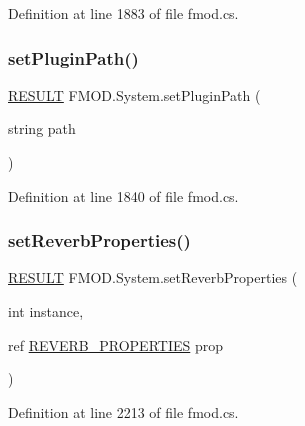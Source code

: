 Definition at line 1883 of file fmod.\+cs.

\mbox{\label{class_f_m_o_d_1_1_system_a7ca34f3a64d08e03eb9683f006e68df2}} 
\subsubsection{\texorpdfstring{set\+Plugin\+Path()}{setPluginPath()}}
{\footnotesize\ttfamily \hyperlink{namespace_f_m_o_d_a305d1176ef3f8c8815861a60407ac33d}{R\+E\+S\+U\+LT} F\+M\+O\+D.\+System.\+set\+Plugin\+Path (\begin{DoxyParamCaption}\item[{string}]{path }\end{DoxyParamCaption})}



Definition at line 1840 of file fmod.\+cs.

\mbox{\label{class_f_m_o_d_1_1_system_a9eb6692c2ca8bb093b1d8ce58959927a}} 
\subsubsection{\texorpdfstring{set\+Reverb\+Properties()}{setReverbProperties()}}
{\footnotesize\ttfamily \hyperlink{namespace_f_m_o_d_a305d1176ef3f8c8815861a60407ac33d}{R\+E\+S\+U\+LT} F\+M\+O\+D.\+System.\+set\+Reverb\+Properties (\begin{DoxyParamCaption}\item[{int}]{instance,  }\item[{ref \hyperlink{struct_f_m_o_d_1_1_r_e_v_e_r_b___p_r_o_p_e_r_t_i_e_s}{R\+E\+V\+E\+R\+B\+\_\+\+P\+R\+O\+P\+E\+R\+T\+I\+ES}}]{prop }\end{DoxyParamCaption})}



Definition at line 2213 of file fmod.\+cs.

\mbox{\label{class_f_m_o_d_1_1_system_afd73f76b6efe4dda3f9414772ae7ac8b}} 

